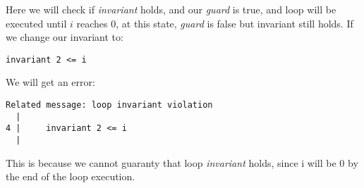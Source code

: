 Here we will check if \textit{invariant} holds, and our \textit{guard} is true, and loop will be executed until $i$ reaches $0$, at this state, \textit{guard} is false but invariant still holds. If we change our invariant to:

\begin{lstlisting}[language=Dafny,caption={Incorrect invariant},label={lst:incorrectloop}]
invariant 2 <= i
\end{lstlisting}

We will get an error:

\begin{lstlisting}[language=Dafny,caption={Error on loop invariant},label={lst:looperror}]
 Related message: loop invariant violation
  |
4 |     invariant 2 <= i
  |
\end{lstlisting}

This is because we cannot guaranty that loop \textit{invariant} holds, since i will be $0$ by the end of the loop execution.
